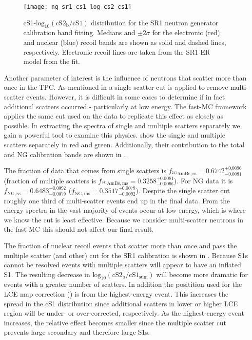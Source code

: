 \begin{figure}
\centering
\texttt{[image: ng\_sr1\_cs1\_log\_cs2\_cs1]}
\caption{cS1-$\mathrm{log}_{10}(\mathrm{cS2_b / cS1})$ distribution for the SR1 neutron generator calibration band fitting.  Medians and
$\pm 2\sigma$ for the electronic (red) and nuclear (blue) recoil bands are shown as solid and dashed lines, respectively.  Electronic
recoil lines are taken from the SR1 ER model from the fit.}
\label{fig:er_nr_calibrations_results_ng_sr1_cs1_log_cs2_cs1}
\end{figure}

Another parameter of interest is the influence of neutrons that scatter more than once in the TPC.  As mentioned in
 a single scatter cut is applied to remove multi-scatter events.  However,
it is difficult in some cases to determine if in fact additional scatters occurred - particularly at low energy.  The fast-MC
framework applies the same cut used on the data to replicate this effect as closely as possible.  In extracting the spectra of single and
multiple scatters separately we gain a powerful tool to examine this physics.  \figref{} show the single and multiple scatters separately
in red and green.  Additionally, their contribution to the total \ambe and NG calibration bands are shown in
\figref{}.

The fraction of \ambe data that comes from single scatters is $f_{\mathrm{^{241}AmBe, ss}} = 0.6742_{-0.0081}^{+0.0096}$
(fraction of multiple scatters is $f_{\mathrm{^{241}AmBe, ms}} = 0.3258_{-0.0096}^{+0.0081}$).  For NG data it is
$f_{\mathrm{NG, ss}} = 0.6483_{-0.0079}^{+0.0092}$ ($f_{\mathrm{NG, ms}} = 0.3517_{-0.0092}^{+0.0079}$).  Despite the single scatter cut
roughly one third of multi-scatter events end up in the final data.  From the energy spectra in
 the vast majority of events occur at low energy, which is where
we know the cut is least effective.  Because we consider multi-scatter neutrons in the fast-MC this should not affect our final
result.

The fraction of nuclear recoil events that scatter more than once and pass the multiple scatter (and other) cut for the SR1 \ambe
calibration is shown in
.  Because S1s cannot be resolved events with multiple scatters will appear to have an
inflated S1.  The resulting decrease in $\mathrm{log}_{10}(\mathrm{cS2_b / cS1_{sum}})$ will become more dramatic for events with a
greater number of scatters.  In addition the positition used for the LCE map correction
() is from the highest-energy event.  This
increases the spread in the cS1 distribution since additional scatters in lower or higher LCE region will be under- or over-corrected,
respectively.  As the highest-energy event increases, the relative effect becomes smaller since the multiple scatter cut prevents large
secondary \stwob and therefore large S1s.

